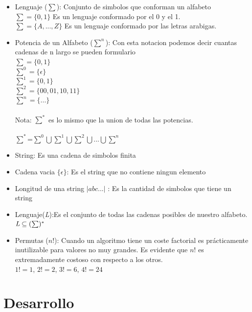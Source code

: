 \documentclass{article}
\begin{document}
\begin{itemize}
    \item Lenguaje ($\sum$): Conjunto de simbolos que conforman un alfabeto
    \\$\sum = \{ 0, 1\}$ Es un lenguaje conformado por el 0 y el 1.
    \\$\sum = \{A, ..., Z\}$ Es un lenguaje conformado por las letras arabigas.\\
    \item Potencia de un Alfabeto ($\sum^n$): Con esta notacion podemos decir cuantas cadenas de n largo se pueden formulario
    \\$\sum = \{0,1\}$
    \\$\sum^0 = \{\epsilon\}$
    \\$\sum^1 = \{0,1\}$
    \\$\sum^2 = \{00,01,10,11\}$
    \\$\sum^n = \{...\}$\\
    \\Nota: $\sum ^*$ es lo mismo que la union de todas las potencias.
    \\\\$\sum ^*$=$\sum^0\bigcup\sum^1\bigcup\sum^2\bigcup...\bigcup\sum^n$
    \item String: Es una cadena de simbolos finita\\
    \item Cadena vacia $\{\epsilon \}$: Es el string que no contiene ningun elemento\\
    \item Longitud de una string $|abc... \vert $ : Es la cantidad de simbolos que tiene un string\\
    \item Lenguaje(\emph{L}):Es el conjunto de todas las cadenas posibles de nuestro alfabeto.
    \\$\emph{L}\subseteq(\sum)^*$
    \item Permutas ($n!$): Cuando un algoritmo tiene un coste factorial es prácticamente inutilizable para valores no muy
    grandes. Es evidente que $n!$ es extremadamente costoso con respecto a los otros.
    \\$1! = 1$, $2! = 2$, $3! = 6$, $4! = 24$
    
\end{itemize}

\section{Desarrollo}
\end{document}
